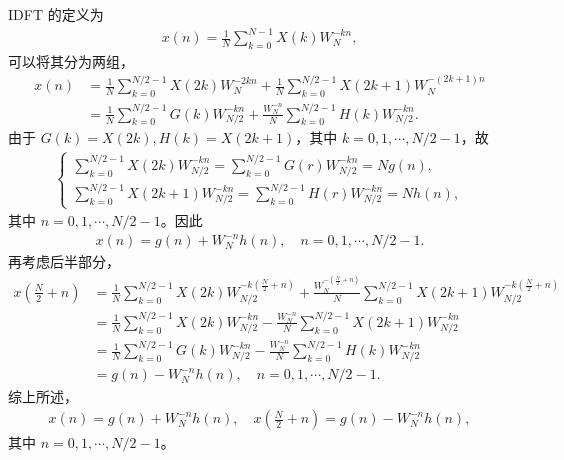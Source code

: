 \begin{solution}
    IDFT 的定义为
    \begin{align*}
        x(n) = \frac{1}{N}\sum_{k = 0}^{N - 1}X(k)W_N^{-kn},
    \end{align*}
    可以将其分为两组，
    \begin{align*}
        x(n) & = \frac{1}{N}\sum_{k = 0}^{N/2 - 1}X(2k)W_N^{-2kn}
            + \frac{1}{N}\sum_{k = 0}^{N/2 - 1}X(2k + 1)W_N^{-(2k + 1)n} \\
        & = \frac{1}{N}\sum_{k = 0}^{N/2 - 1}G(k)W_{N/2}^{-kn}
            + \frac{W_N^{-n}}{N}\sum_{k = 0}^{N/2 - 1}H(k)W_{N/2}^{-kn}.
    \end{align*}
    由于 $G(k) = X(2k), H(k) = X(2k + 1)$，其中 $k = 0, 1, \cdots, N / 2 - 1$，故
    \begin{align*}
        \begin{cases}
            \sum_{k = 0}^{N/2 - 1}X(2k)W_{N/2}^{-kn}
                = \sum_{k = 0}^{N/2 - 1}G(r)W_{N/2}^{-kn} = Ng(n), \\
            \sum_{k = 0}^{N/2 - 1}X(2k + 1)W_{N/2}^{-kn}
                = \sum_{k = 0}^{N/2 - 1}H(r)W_{N/2}^{-kn} = Nh(n),
        \end{cases}
    \end{align*}
    其中 $n = 0, 1, \cdots, N/2 - 1$。因此
    \begin{align*}
        x(n) = g(n) + W_N^{-n}h(n), \quad n = 0, 1, \cdots, N / 2 - 1.
    \end{align*}
    再考虑后半部分，
    \begin{align*}
        x\left(\frac{N}{2} + n\right) & = \frac{1}{N}\sum_{k = 0}^{N/2 - 1}X(2k)W_{N/2}^{-k\left(\frac{N}{2} + n\right)}
            + \frac{W_N^{-\left(\frac{N}{2} + n\right)}}{N}\sum_{k = 0}^{N/2 - 1}X(2k + 1)W_{N/2}^{-k\left(\frac{N}{2} + n\right)} \\
        & = \frac{1}{N}\sum_{k = 0}^{N/2 - 1}X(2k)W_{N/2}^{-kn}
            - \frac{W_N^{-n}}{N}\sum_{k = 0}^{N/2 - 1}X(2k + 1)W_{N/2}^{-kn} \\
        & = \frac{1}{N}\sum_{k = 0}^{N/2 - 1}G(k)W_{N/2}^{-kn}
            - \frac{W_N^{-n}}{N}\sum_{k = 0}^{N/2 - 1}H(k)W_{N/2}^{-kn} \\
        & = g(n) - W_N^{-n}h(n), \quad n = 0, 1, \cdots, N / 2 - 1.
    \end{align*}
    综上所述，
    \begin{align*}
        x(n) = g(n) + W_N^{-n}h(n), \quad x\left(\frac{N}{2} + n\right) = g(n) - W_N^{-n}h(n),
    \end{align*}
    其中 $n = 0, 1, \cdots, N / 2 - 1$。
\end{solution}
